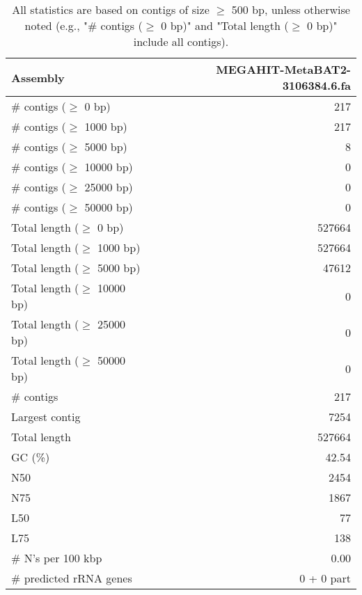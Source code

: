 \documentclass[12pt,a4paper]{article}
\begin{document}
\begin{table}[ht]
\begin{center}
\caption{All statistics are based on contigs of size $\geq$ 500 bp, unless otherwise noted (e.g., "\# contigs ($\geq$ 0 bp)" and "Total length ($\geq$ 0 bp)" include all contigs).}
\begin{tabular}{|l*{1}{|r}|}
\hline
Assembly & MEGAHIT-MetaBAT2-3106384.6.fa \\ \hline
\# contigs ($\geq$ 0 bp) & 217 \\ \hline
\# contigs ($\geq$ 1000 bp) & 217 \\ \hline
\# contigs ($\geq$ 5000 bp) & 8 \\ \hline
\# contigs ($\geq$ 10000 bp) & 0 \\ \hline
\# contigs ($\geq$ 25000 bp) & 0 \\ \hline
\# contigs ($\geq$ 50000 bp) & 0 \\ \hline
Total length ($\geq$ 0 bp) & 527664 \\ \hline
Total length ($\geq$ 1000 bp) & 527664 \\ \hline
Total length ($\geq$ 5000 bp) & 47612 \\ \hline
Total length ($\geq$ 10000 bp) & 0 \\ \hline
Total length ($\geq$ 25000 bp) & 0 \\ \hline
Total length ($\geq$ 50000 bp) & 0 \\ \hline
\# contigs & 217 \\ \hline
Largest contig & 7254 \\ \hline
Total length & 527664 \\ \hline
GC (\%) & 42.54 \\ \hline
N50 & 2454 \\ \hline
N75 & 1867 \\ \hline
L50 & 77 \\ \hline
L75 & 138 \\ \hline
\# N's per 100 kbp & 0.00 \\ \hline
\# predicted rRNA genes & 0 + 0 part \\ \hline
\end{tabular}
\end{center}
\end{table}
\end{document}
